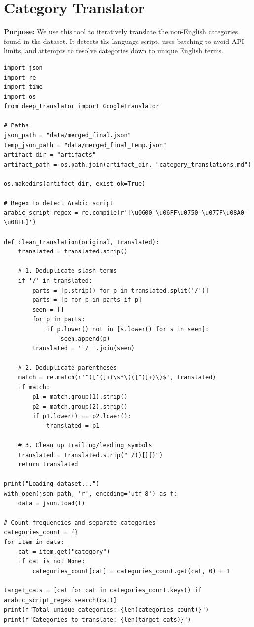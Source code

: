 \documentclass[11pt]{article}
\begin{document}
\section{Category Translator} \label{sec:translator}
\textbf{Purpose:} We use this tool to iteratively translate the non-English categories found in the dataset. It detects the language script, uses batching to avoid API limits, and attempts to resolve categories down to unique English terms.

\begin{lstlisting}[style=pythoncode, caption={translate\_categories.py}]
import json
import re
import time
import os
from deep_translator import GoogleTranslator

# Paths
json_path = "data/merged_final.json"
temp_json_path = "data/merged_final_temp.json"
artifact_dir = "artifacts"
artifact_path = os.path.join(artifact_dir, "category_translations.md")

os.makedirs(artifact_dir, exist_ok=True)

# Regex to detect Arabic script
arabic_script_regex = re.compile(r'[\u0600-\u06FF\u0750-\u077F\u08A0-\u08FF]')

def clean_translation(original, translated):
    translated = translated.strip()
    
    # 1. Deduplicate slash terms
    if '/' in translated:
        parts = [p.strip() for p in translated.split('/')]
        parts = [p for p in parts if p]
        seen = []
        for p in parts:
            if p.lower() not in [s.lower() for s in seen]:
                seen.append(p)
        translated = ' / '.join(seen)
        
    # 2. Deduplicate parentheses
    match = re.match(r'^([^(]+)\s*\(([^)]+)\)$', translated)
    if match:
        p1 = match.group(1).strip()
        p2 = match.group(2).strip()
        if p1.lower() == p2.lower():
            translated = p1
            
    # 3. Clean up trailing/leading symbols
    translated = translated.strip(" /()[]{}")
    return translated

print("Loading dataset...")
with open(json_path, 'r', encoding='utf-8') as f:
    data = json.load(f)

# Count frequencies and separate categories
categories_count = {}
for item in data:
    cat = item.get("category")
    if cat is not None:
        categories_count[cat] = categories_count.get(cat, 0) + 1

target_cats = [cat for cat in categories_count.keys() if arabic_script_regex.search(cat)]
print(f"Total unique categories: {len(categories_count)}")
print(f"Categories to translate: {len(target_cats)}")


\end{lstlisting}
\end{document}
